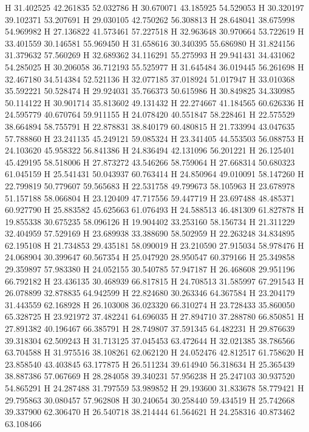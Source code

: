 \documentclass{article}
\begin{document}
H 31.402525 42.261835 52.032786
H 30.670071 43.185925 54.529053
H 30.320197 39.102371 53.207691
H 29.030105 42.750262 56.308813
H 28.648041 38.675998 54.969982
H 27.136822 41.573461 57.227518
H 32.963648 30.970664 53.722619
H 33.401559 30.146581 55.969450
H 31.658616 30.340395 55.686980
H 31.824156 31.379632 57.560269
H 32.689362 34.116291 55.275993
H 29.941431 34.431062 54.285025
H 30.206058 36.712193 55.525977
H 31.645484 36.019445 56.261698
H 32.467180 34.514384 52.521136
H 32.077185 37.018924 51.017947
H 33.010368 35.592221 50.528474
H 29.924031 35.766373 50.615986
H 30.849825 34.330985 50.114122
H 30.901714 35.813602 49.131432
H 22.274667 41.184565 60.626336
H 24.595779 40.670764 59.911155
H 24.078420 40.551847 58.228461
H 22.575529 38.664894 58.755791
H 22.878831 38.840179 60.480815
H 21.733994 43.047635 57.788860
H 23.241135 45.249121 59.085324
H 23.341405 44.553503 56.088753
H 24.103620 45.958322 56.841386
H 24.836494 42.131096 56.201221
H 26.125401 45.429195 58.518006
H 27.873272 43.546266 58.759064
H 27.668314 50.680323 61.045159
H 25.541431 50.043937 60.763414
H 24.850964 49.010091 58.147260
H 22.799819 50.779607 59.565683
H 22.531758 49.799673 58.105963
H 23.678978 51.157188 58.066804
H 23.120409 47.717556 59.447719
H 23.697488 48.485371 60.927790
H 25.883582 45.625663 61.076493
H 24.588513 46.481309 61.827878
H 19.855338 30.675235 58.096126
H 19.904402 33.253160 58.156734
H 21.311229 32.404959 57.529169
H 23.689938 33.388690 58.502959
H 22.263248 34.834895 62.195108
H 21.734853 29.435181 58.090019
H 23.210590 27.915034 58.978476
H 24.068904 30.399647 60.567354
H 25.047920 28.950547 60.379166
H 25.349858 29.359897 57.983380
H 24.052155 30.540785 57.947187
H 26.468608 29.951196 66.792182
H 23.436135 30.468939 66.817815
H 24.708513 31.585997 67.291543
H 26.078899 32.878835 64.942599
H 22.824680 30.263346 64.367584
H 23.204179 31.443559 62.168928
H 26.103008 36.023320 66.310274
H 23.728433 35.860050 65.328725
H 23.921972 37.482241 64.696035
H 27.894710 37.288780 66.850851
H 27.891382 40.196467 66.385791
H 28.749807 37.591345 64.482231
H 29.876639 39.318304 62.509243
H 31.713125 37.045453 63.472644
H 32.021385 38.786566 63.704588
H 31.975516 38.108261 62.062120
H 24.052476 42.812517 61.758620
H 23.858540 43.403845 63.177875
H 26.511234 39.614940 56.318634
H 25.365439 38.887386 57.067669
H 28.284058 39.340231 57.956238
H 25.247103 30.937520 54.865291
H 24.287488 31.797559 53.989852
H 29.193600 31.833678 58.779421
H 29.795863 30.080457 57.962808
H 30.240654 30.258440 59.434519
H 25.742668 39.337900 62.306470
H 26.540718 38.214444 61.564621
H 24.258316 40.873462 63.108466
\end{document}
